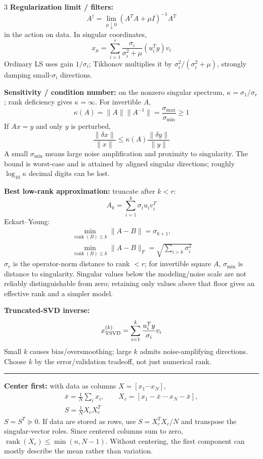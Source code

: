\documentclass[10pt]{article}
\newcommand{\sect}[1]{\vspace{0.9pt}{\fontsize{7.2}{7.5}\selectfont\textbf{#1}}\vspace{0.25pt}\hrule\vspace{0.8pt}}
\newcommand{\sub}[1]{\textbf{#1}}
\newcommand{\rank}{\operatorname{rank}}
\begin{document}
\begin{multicols*}{3}
\sub{Regularization limit / filters:}
\[
A^\dagger=\lim_{\mu\downarrow0}(A^TA+\mu I)^{-1}A^T
\]
in the action on data. In singular coordinates,
\[
x_\mu=\sum_{i=1}^r
\frac{\sigma_i}{\sigma_i^2+\mu}(u_i^Ty)v_i
\]
Ordinary LS uses gain \(1/\sigma_i\); Tikhonov multiplies it by
\(\sigma_i^2/(\sigma_i^2+\mu)\), strongly damping small-\(\sigma_i\)
directions.

\sub{Sensitivity / condition number:} on the nonzero singular spectrum,
\(\kappa=\sigma_1/\sigma_r\); rank deficiency gives
\(\kappa=\infty\). For invertible \(A\),
\[
\kappa(A)=\|A\|\|A^{-1}\|
=\frac{\sigma_{\max}}{\sigma_{\min}}\ge1
\]
If \(Ax=y\) and only \(y\) is perturbed,
\[
\frac{\|\delta x\|}{\|x\|}
\le\kappa(A)\frac{\|\delta y\|}{\|y\|}
\]
A small \(\sigma_{\min}\) means large noise amplification and proximity
to singularity. The bound is worst-case and is attained by aligned
singular directions; roughly \(\log_{10}\kappa\) decimal digits can be
lost.

\sub{Best low-rank approximation:} truncate after \(k<r\):
\[
A_k=\sum_{i=1}^k\sigma_i u_iv_i^T
\]
Eckart--Young:
\[
\begin{gathered}
\min_{\rank(B)\le k}\|A-B\|=\sigma_{k+1},\\
\min_{\rank(B)\le k}\|A-B\|_F=\sqrt{\sum_{i>k}\sigma_i^2}
\end{gathered}
\]
\(\sigma_r\) is the operator-norm distance to rank \(<r\); for invertible
square \(A\), \(\sigma_{\min}\) is distance to singularity.
Singular values below the modeling/noise scale are not reliably
distinguishable from zero; retaining only values above that floor gives
an effective rank and a simpler model.

\sub{Truncated-SVD inverse:}
\[
x_{\rm TSVD}^{(k)}
=\sum_{i=1}^k\frac{u_i^Ty}{\sigma_i}v_i
\]
Small \(k\) causes bias/oversmoothing; large \(k\) admits
noise-amplifying directions. Choose \(k\) by the error/validation
tradeoff, not just numerical rank.

\sect{PCA (Lecture 18)}
\sub{Center first:} with data as columns \(X=[x_1\cdots x_N]\),
\[
\begin{gathered}
\bar x=\frac1N\sum_i x_i,\qquad
X_c=[x_1-\bar x\ \cdots\ x_N-\bar x],\\
S=\frac1N X_cX_c^T
\end{gathered}
\]
\(S=S^T\succeq0\). If data are stored as rows, use
\(S=X_c^TX_c/N\) and transpose the singular-vector roles.
Since centered columns sum to zero,
\(\rank(X_c)\le\min(n,N-1)\). Without centering, the first component can
mostly describe the mean rather than variation.


\end{multicols*}
\end{document}
